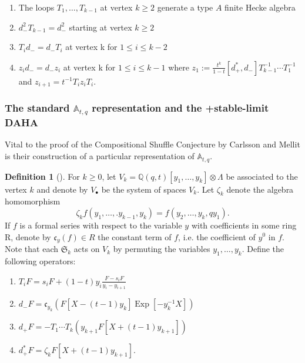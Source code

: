 \documentclass[11pt]{article}
\theoremstyle{definition}
\newtheorem{defi}[theo]{Definition}
\numberwithin{equation}{section}
\DeclareMathOperator{\EXP}{\mathrm{Exp}}
\begin{document}
\begin{center}

\begin{enumerate}
    \item The loops $T_1,\ldots,T_{k-1}$ at vertex $k\geq 2$ generate a type $A$ finite Hecke algebra 
    \item $d_{-}^2T_{k-1} = d_{-}^2$ starting at vertex $k \geq 2$
    \item  $T_id_{-} = d_{-}T_i$ at vertex k for $1\leq i\leq k-2$
    \item $z_id_{-}= d_{-}z_i$ at vertex k for $1\leq i \leq k-1$ where $z_1 := \frac{t^k}{1-t}[d_{+}^{*},d_{-}]T_{k-1}^{-1}\cdots T_{1}^{-1}$ and $z_{i+1} = t^{-1}T_iz_iT_i.$
 \end{enumerate}

 \end{center}


\subsubsection{The standard $\mathbb{A}_{t,q}$ representation and the +stable-limit DAHA}

Vital to the proof of the Compositional Shuffle Conjecture by Carlsson and Mellit \cite{CM_2015} is their construction of a particular representation of $\mathbb{A}_{t,q}$. 


\begin{defi}[\cite{CM_2015}]\label{A qt defns}
    For $k \geq 0$, let $V_k = \mathbb{Q}(q,t)[y_1,\ldots,y_k]\otimes \Lambda$ be associated to the vertex $k$ and denote by $V_{\bullet}$ be the system of spaces $V_k$. Let $\zeta_k$ denote the algebra homomorphism $$\zeta_kf(y_1,\ldots,.y_{k-1},y_k) = f(y_2,\ldots,y_k,qy_1).$$ If $f$ is a formal series with respect to the variable $y$ with coefficients in some ring R, denote by $\mathfrak{c}_{y}(f) \in R$ the constant term of $f$, i.e. the coefficient of $y^{0}$ in $f$. Note that each $\mathfrak{S}_k$ acts on $V_k$ by permuting the variables $y_1,\ldots,y_k.$ Define the following operators:
\begin{enumerate}
    \item $T_iF = s_iF + (1-t)y_i \frac{F-s_iF}{y_i-y_{i+1}}$
    \item $d_{-}F = \mathfrak{c}_{y_k}(F[X-(t-1)y_k]\EXP[-y_k^{-1}X])$
    \item $d_{+}F = -T_1\cdots T_k (y_{k+1}F[X+(t-1)y_{k+1}])$
    \item $d_{+}^{*}F = \zeta_kF[X+(t-1)y_{k+1}].$
\end{enumerate}
\end{defi}
\end{document}
